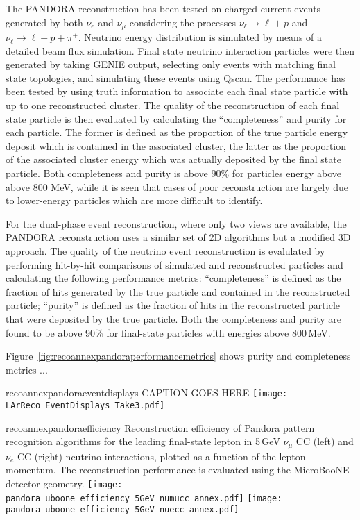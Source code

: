 The PANDORA reconstruction has been tested on charged current events generated by both   $\nu_{e}$  and $\nu_{\mu}$  
considering the processes $\nu_{\ell}\to \ell+p$  and $\nu_{\ell}\to \ell+p+\pi^{+}$.
Neutrino energy distribution is simulated by means of a detailed beam flux simulation.
Final state neutrino interaction particles were then generated by taking GENIE output, selecting only events with matching final state topologies, 
and simulating these events using Qscan.
 The performance has been tested by using truth information to associate each final state particle with up to one reconstructed cluster.
The quality of the reconstruction of each final state particle is then evaluated by calculating the ``completeness'' and purity for each particle.
The former is defined as the proportion of the true particle energy deposit which 
is contained in the associated cluster, the latter as  the proportion of the associated cluster energy which was actually deposited by the final state particle.
Both completeness and purity is above 90$\%$ for particles energy above above 800 MeV, while
it is seen that cases of poor reconstruction are largely due to lower-energy particles which are more difficult to identify.


For the dual-phase event reconstruction, where only two views are available,
the PANDORA reconstruction uses a similar set of 2D algorithms but
a modified 3D approach. The quality of the neutrino event reconstruction 
is evalulated by performing hit-by-hit comparisons of simulated and 
reconstructed particles and calculating the following performance metrics: 
``completeness'' is defined as the fraction of hits generated by 
the true particle and contained in the reconstructed particle; 
``purity'' is defined as the fraction of hits in the reconstructed 
particle that were deposited by the true particle. 
Both the completeness and purity are found to be above 90$\%$ for 
final-state particles with energies above 800\,MeV.

Figure~\ref{fig:recoannexpandoraperformancemetrics} shows purity and completeness metrics ...




\begin{cdrfigure}{recoannexpandoraeventdisplays}
{CAPTION GOES HERE}
\texttt{[image: LArReco\_EventDisplays\_Take3.pdf]}
\end{cdrfigure}

\begin{cdrfigure}{recoannexpandoraefficiency}
{Reconstruction efficiency of Pandora pattern recognition algorithms
 for the leading final-state lepton in 5\,GeV $\nu_{\mu}$ CC (left) and
 $\nu_{e}$ CC (right) neutrino interactions, plotted as a function of
 the lepton momentum. The reconstruction performance is evaluated
 using the MicroBooNE detector geometry. }
\texttt{[image: pandora\_uboone\_efficiency\_5GeV\_numucc\_annex.pdf]}
\texttt{[image: pandora\_uboone\_efficiency\_5GeV\_nuecc\_annex.pdf]}
\end{cdrfigure}


